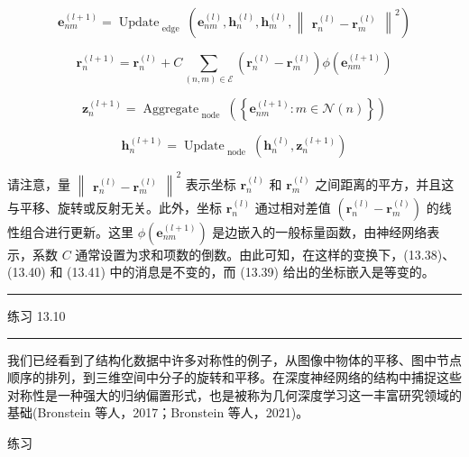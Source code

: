 \documentclass[10pt]{report}
\newcommand{\HRule}{\begin{center}\rule{0.9\linewidth}{0.2mm}\end{center}}
\begin{document}
\[
{\mathbf{e}}_{nm}^{\left( l + 1\right) } = {\operatorname{Update}}_{\text{ edge }}\left( {{\mathbf{e}}_{nm}^{\left( l\right) },{\mathbf{h}}_{n}^{\left( l\right) },{\mathbf{h}}_{m}^{\left( l\right) },{\begin{Vmatrix}{\mathbf{r}}_{n}^{\left( l\right) } - {\mathbf{r}}_{m}^{\left( l\right) }\end{Vmatrix}}^{2}}\right)  \tag{13.38}
\]

\[
{\mathbf{r}}_{n}^{\left( l + 1\right) } = {\mathbf{r}}_{n}^{\left( l\right) } + C\mathop{\sum }\limits_{{\left( {n,m}\right)  \in  \mathcal{E}}}\left( {{\mathbf{r}}_{n}^{\left( l\right) } - {\mathbf{r}}_{m}^{\left( l\right) }}\right) \phi \left( {\mathbf{e}}_{nm}^{\left( l + 1\right) }\right)  \tag{13.39}
\]

\[
{\mathbf{z}}_{n}^{\left( l + 1\right) } = {\operatorname{Aggregate}}_{\text{ node }}\left( \left\{  {{\mathbf{e}}_{nm}^{\left( l + 1\right) } : m \in  \mathcal{N}\left( n\right) }\right\}  \right)  \tag{13.40}
\]

\[
{\mathbf{h}}_{n}^{\left( l + 1\right) } = {\operatorname{Update}}_{\text{ node }}\left( {{\mathbf{h}}_{n}^{\left( l\right) },{\mathbf{z}}_{n}^{\left( l + 1\right) }}\right)  \tag{13.41}
\]

请注意，量 \({\begin{Vmatrix}{\mathbf{r}}_{n}^{\left( l\right) } - {\mathbf{r}}_{m}^{\left( l\right) }\end{Vmatrix}}^{2}\) 表示坐标 \({\mathbf{r}}_{n}^{\left( l\right) }\) 和 \({\mathbf{r}}_{m}^{\left( l\right) }\) 之间距离的平方，并且这与平移、旋转或反射无关。此外，坐标 \({\mathbf{r}}_{n}^{\left( l\right) }\) 通过相对差值 \(\left( {{\mathbf{r}}_{n}^{\left( l\right) } - {\mathbf{r}}_{m}^{\left( l\right) }}\right)\) 的线性组合进行更新。这里 \(\phi \left( {\mathbf{e}}_{nm}^{\left( l + 1\right) }\right)\) 是边嵌入的一般标量函数，由神经网络表示，系数 \(C\) 通常设置为求和项数的倒数。由此可知，在这样的变换下，(13.38)、(13.40) 和 (13.41) 中的消息是不变的，而 (13.39) 给出的坐标嵌入是等变的。

\HRule

练习 13.10

\HRule

我们已经看到了结构化数据中许多对称性的例子，从图像中物体的平移、图中节点顺序的排列，到三维空间中分子的旋转和平移。在深度神经网络的结构中捕捉这些对称性是一种强大的归纳偏置形式，也是被称为几何深度学习这一丰富研究领域的基础(Bronstein 等人，2017；Bronstein 等人，2021)。

练习
\end{document}
